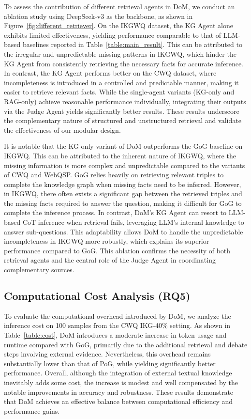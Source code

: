 To assess the contribution of different retrieval agents in DoM, we conduct an ablation study using DeepSeek-v3 as the backbone, as shown in Figure~\ref{fig:different_retriever}. On the IKGWQ dataset, the KG Agent alone exhibits limited effectiveness, yielding performance comparable to that of LLM-based baselines reported in Table~\ref{table:main_result}. This can be attributed to the irregular and unpredictable missing patterns in IKGWQ, which hinder the KG Agent from consistently retrieving the necessary facts for accurate inference. In contrast, the KG Agent performs better on the CWQ dataset, where incompleteness is introduced in a controlled and predictable manner, making it easier to retrieve relevant facts. While the single-agent variants (KG-only and RAG-only) achieve reasonable performance individually, integrating their outputs via the Judge Agent yields significantly better results. These results underscore the complementary nature of structured and unstructured retrieval and validate the effectiveness of our modular design.

It is notable that the KG-only variant of DoM outperforms the GoG baseline on IKGWQ. This can be attributed to the inherent nature of IKGWQ, where the missing information is more complex and unpredictable compared to the variants of CWQ and WebQSP. GoG relies heavily on retrieving relevant triples to complete the knowledge graph when missing facts need to be inferred. However, in IKGWQ, there often exists a significant gap between the retrieved triples and the missing facts required to answer the question, making it difficult for GoG to complete the inference process. In contrast, DoM's KG Agent can resort to LLM-based CoT inference when retrieval fails, leveraging LLM's internal knowledge to answer sub-questions. This adaptability allows DoM to handle the unpredictable incompleteness in IKGWQ more robustly, which explains its superior performance compared to GoG. This ablation confirms the necessity of both retrieval agents and the central role of the Judge Agent in coordinating complementary sources.



\subsection{Computational Cost Analysis (RQ5)}


To evaluate the computational overhead introduced by DoM, we analyze the inference cost on 100 samples from the CWQ IKG-40\% setting. As shown in Table~\ref{table:cost}, DoM introduces a moderate increase in token usage and runtime compared with GoG, primarily due to the additional retrieval and debate steps involving external evidence. Nevertheless, this overhead remains substantially lower than that of PoG, while yielding significantly better performance. Overall, although the integration of external textual knowledge inevitably adds some cost, the increase is modest and well compensated by the notable improvements in accuracy and robustness. These results demonstrate that DoM achieves an effective balance between computational efficiency and performance gains.





